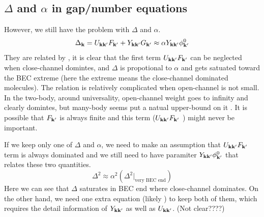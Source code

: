 \subsection{$\Delta$ and $\alpha$ in gap/number equations}
However, we still have the problem with $\Delta$ and $\alpha$.  
\begin{equation}\label{eq:20101011:delta}
\Delta_{\mathbf{k}}=U_{\mathbf{k}\mathbf{k}'}F_{\mathbf{k}'}+Y_{\mathbf{k}\mathbf{k}'}G_{\mathbf{k}'}\approx\alpha{Y_{\ensuremath{\mathbf{k}}\ensuremath{\mathbf{k}}'}\phi^{0}_{\ensuremath{\mathbf{k}}'}}
\end{equation}
They are related by , it is clear that the first term $U_{\mathbf{k}\mathbf{k}'}F_{\mathbf{k}'}$ can be neglected when close-channel domintes, and $\Delta$ is propotional to $\alpha$ and gets satuated toward the BEC extreme (here the extreme means the close-channel dominated molecules).  The relation is relatively complicated when open-channel is not small. In the two-body, around universality, open-channel weight goes to infinity and clearly domintes, but many-body seems put a natual upper-bound on it . It is possible that $F_{\mathbf{k}'}$ is always finite and  this term ($U_{\mathbf{k}\mathbf{k}'}F_{\mathbf{k}'}$ ) might never be important.  

If we keep only one of $\Delta$ and $\alpha$, we need to make an assumption that $U_{\mathbf{k}\mathbf{k}'}F_{\mathbf{k}'}$ term is always dominated and we still need to have paramiter $Y_{\mathbf{k}\mathbf{k}'}\phi^{0}_{\mathbf{k}'}$ that relates these two quantities. 
\begin{equation}\label{eq:20101011:deltaAlpha}\Delta^{2}\approx\alpha^{2}(\Delta^{2}|_{\text{very BEC end}})
\end{equation}
Here we can see that $\Delta$ saturates in BEC end where close-channel dominates.   On the other hand, we need one extra equation (likely ) to keep both of them, which requires the detail information of $Y_{\mathbf{k}\mathbf{k}'}$ as well as $U_{\mathbf{k}\mathbf{k}'}$.  (Not clear????)
